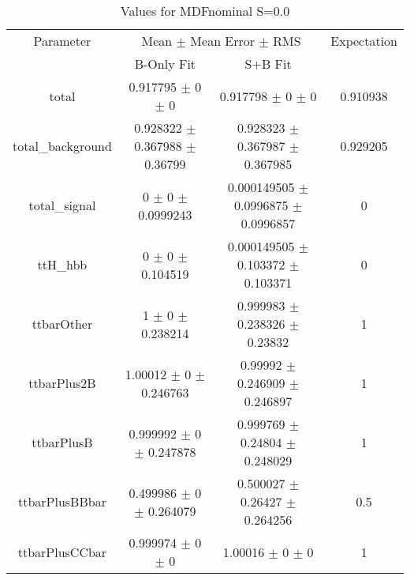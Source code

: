 \begin{table}
\centering
\caption{Values for MDFnominal S=0.0}
\begin{tabular}{cccc}
\toprule
Parameter & \multicolumn{2}{c}{Mean $\pm$ Mean Error $\pm$ RMS} & Expectation\\
 & B-Only Fit & S+B Fit & \\
\midrule
total & \num{0.917795} $\pm$ \num{0} $\pm$ \num{0} & \num{0.917798} $\pm$ \num{0} $\pm$ \num{0} & \num{0.910938}\\
total\_background & \num{0.928322} $\pm$ \num{0.367988} $\pm$ \num{0.36799} & \num{0.928323} $\pm$ \num{0.367987} $\pm$ \num{0.367985} & \num{0.929205}\\
total\_signal & \num{0} $\pm$ \num{0} $\pm$ \num{0.0999243} & \num{0.000149505} $\pm$ \num{0.0996875} $\pm$ \num{0.0996857} & \num{0}\\
ttH\_hbb & \num{0} $\pm$ \num{0} $\pm$ \num{0.104519} & \num{0.000149505} $\pm$ \num{0.103372} $\pm$ \num{0.103371} & \num{0}\\
ttbarOther & \num{1} $\pm$ \num{0} $\pm$ \num{0.238214} & \num{0.999983} $\pm$ \num{0.238326} $\pm$ \num{0.23832} & \num{1}\\
ttbarPlus2B & \num{1.00012} $\pm$ \num{0} $\pm$ \num{0.246763} & \num{0.99992} $\pm$ \num{0.246909} $\pm$ \num{0.246897} & \num{1}\\
ttbarPlusB & \num{0.999992} $\pm$ \num{0} $\pm$ \num{0.247878} & \num{0.999769} $\pm$ \num{0.24804} $\pm$ \num{0.248029} & \num{1}\\
ttbarPlusBBbar & \num{0.499986} $\pm$ \num{0} $\pm$ \num{0.264079} & \num{0.500027} $\pm$ \num{0.26427} $\pm$ \num{0.264256} & \num{0.5}\\
ttbarPlusCCbar & \num{0.999974} $\pm$ \num{0} $\pm$ \num{0} & \num{1.00016} $\pm$ \num{0} $\pm$ \num{0} & \num{1}\\
\bottomrule
\end{tabular}
\end{table}